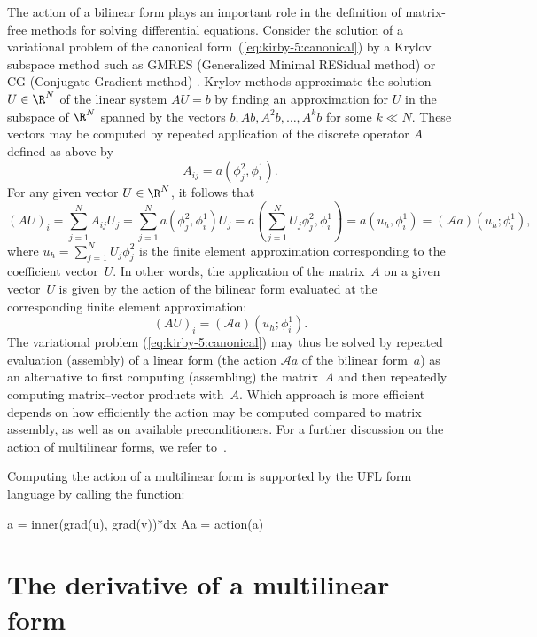 The action of a bilinear form plays an important role in the
definition of matrix-free methods for solving differential
equations. Consider the solution of a variational problem of the
canonical form~(\ref{eq:kirby-5:canonical}) by a Krylov subspace
method such as GMRES (Generalized Minimal RESidual
method) \citep{SaadSchultz1986} or CG (Conjugate Gradient
method) \citep{HestenesStiefel1952}. Krylov methods approximate the
solution $U\in\R^N$ of the linear system $AU=b$ by finding an
approximation for $U$ in the subspace of $\R^N$ spanned by the vectors
$b, Ab, A^2b, \ldots, A^kb$ for some $k \ll N$. These vectors may be
computed by repeated application of the discrete operator $A$ defined
as above by
\begin{equation}
  A_{ij} = a(\phi^2_j, \phi^1_i).
\end{equation}
For any given vector $U \in \R^N$, it follows that
\begin{equation}
  (A U)_i = \sum_{j=1}^N A_{ij} U_j
  = \sum_{j=1}^N a(\phi^2_j, \phi^1_i) U_j
  = a\left(\sum_{j=1}^N U_j \phi^2_j, \phi^1_i \right)
  = a(u_h, \phi^1_i) = (\mathcal{A} a) (u_h; \phi^1_i),
\end{equation}
where $u_h = \sum_{j=1}^N U_j \phi^2_j$ is the finite element
approximation corresponding to the coefficient vector~$U$.  In other
words, the application of the matrix~$A$ on a given vector~$U$ is
given by the action of the bilinear form evaluated at the
corresponding finite element approximation:
\begin{equation}
  (A U)_i = (\mathcal{A} a) (u_h; \phi^1_i).
\end{equation}
The variational problem (\ref{eq:kirby-5:canonical}) may thus be
solved by repeated evaluation (assembly) of a linear form (the action
$\mathcal{A} a$ of the bilinear form~$a$) as an alternative to first
computing (assembling) the matrix~$A$ and then repeatedly computing
matrix--vector products with~$A$. Which approach is more efficient
depends on how efficiently the action may be computed compared to
matrix assembly, as well as on available preconditioners. For a
further discussion on the action of multilinear forms, we refer
to~\citet{BagheriScott2004}.

Computing the action of a multilinear form is supported by the UFL
form language by calling the  function:
\begin{python}
a  = inner(grad(u), grad(v))*dx
Aa = action(a)
\end{python}

\section{The derivative of a multilinear form}

